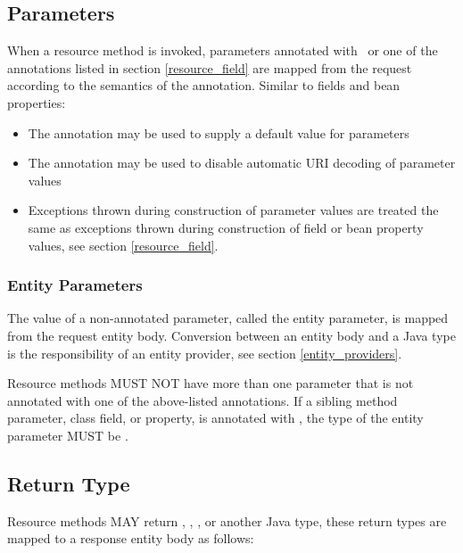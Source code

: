\subsection{Parameters}
\label{resource_method_params}

When a resource method is invoked, parameters annotated with \FormParam\ or one of the  annotations listed in section \ref{resource_field} are mapped from the request according to the semantics of the annotation. Similar to fields and bean properties:
\begin{itemize}
\item The  annotation may be used to supply a default value for parameters
\item The  annotation may be used to disable automatic URI decoding of parameter values
\item Exceptions thrown during construction of parameter values are treated the same as exceptions thrown during construction of field or bean property values, see section \ref{resource_field}.
\end{itemize}

\subsubsection{Entity Parameters}

The value of a non-annotated parameter, called the entity parameter, is mapped from the request entity body. Conversion between an entity body and a Java type is the responsibility of an entity provider, see section \ref{entity_providers}.

Resource methods MUST NOT have more than one parameter that is not annotated with one of the above-listed annotations. If a sibling method parameter, class field, or property, is annotated with \FormParam, the type of the entity parameter MUST be .

\subsection{Return Type}
\label{resource_method_return}

Resource methods MAY return , \Response, , or another Java type, these return types are mapped to a response entity body as follows:

